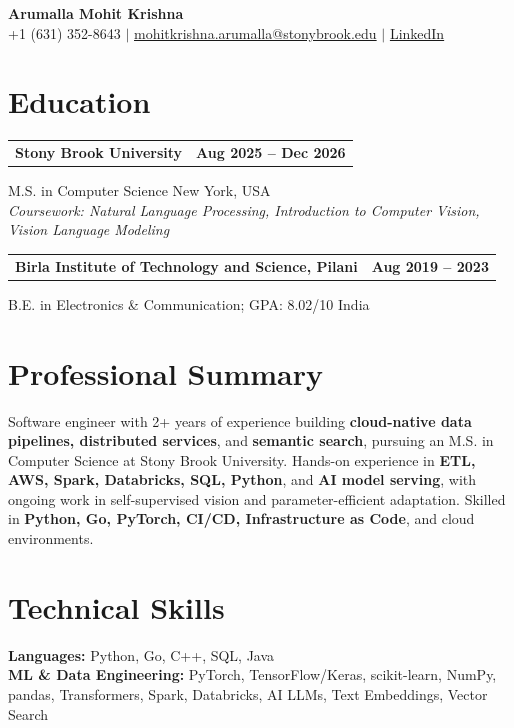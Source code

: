 \documentclass[letterpaper,10pt]{article}
\makeatletter
\newcommand{\entry}[2]{%
  \noindent
  \begin{tabularx}{\linewidth}
    {@{}>{\raggedright\arraybackslash}X@{\hspace{6pt}}r@{}}
    \textbf{#1} & #2
  \end{tabularx}\par
}
\makeatother
\begin{document}
\begin{center}
    {\LARGE\bfseries Arumalla Mohit Krishna}\\[3pt]
    +1 (631) 352-8643 $|$
    \href{mailto:mohitkrishna.arumalla@stonybrook.edu}
    {mohitkrishna.arumalla@stonybrook.edu} $|$
    \href{https://linkedin.com/in/mohit-krishna-arumalla}
    {LinkedIn}
\end{center}
\vspace{-8pt}

\section{Education}

\entry
  {\textbf{Stony Brook University}}
  {\textbf{Aug 2025 -- Dec 2026}}

M.S. in Computer Science \hfill New York, USA\\
\textit{
Coursework: Natural Language Processing,
Introduction to Computer Vision, Vision Language Modeling
}
\vspace{3pt}

\entry
  {\textbf{Birla Institute of Technology and Science, Pilani}}
  {\textbf{Aug 2019 -- 2023}}

B.E. in Electronics \& Communication; GPA: 8.02/10 \hfill India
\section{Professional Summary}

Software engineer with 2+ years of experience building \textbf{cloud-native data pipelines, distributed services}, and \textbf{semantic search}, pursuing an M.S. in Computer Science at Stony Brook University. Hands-on experience in \textbf{ETL, AWS, Spark, Databricks, SQL, Python}, and \textbf{AI model serving}, with ongoing work in self-supervised vision and parameter-efficient adaptation. Skilled in \textbf{Python, Go, PyTorch, CI/CD, Infrastructure as Code}, and cloud environments.

\section{Technical Skills}

\textbf{Languages:}
Python, Go, C++, SQL, Java\\

\textbf{ML \& Data Engineering:}
PyTorch, TensorFlow/Keras, scikit-learn, NumPy, pandas,
Transformers, Spark, Databricks, AI LLMs, Text Embeddings, Vector Search \\
\end{document}
